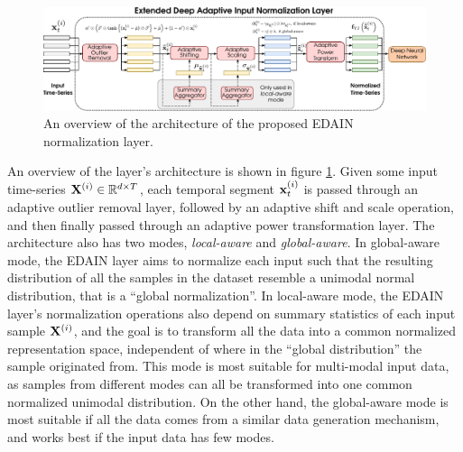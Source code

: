 \documentclass{statsmsc}
\begin{document}
\begin{figure}
\begin{center}
    \includegraphics[width=\textwidth]{diagrams/edain-diagram.pdf}
\end{center}
\caption{An overview of the architecture of the proposed \ac{EDAIN} normalization layer.}
\label{fig:edain-arch}
\end{figure}

An overview of the layer's architecture is shown in figure \cref{fig:edain-arch}.
Given some input time-series $\mathbf{X}^{(i)} \in \mathbb{R}^{d \times T}$, each temporal segment
$\mathbf{x}^{(i)}_t$ is passed through an adaptive outlier removal layer, followed by an adaptive shift
and scale operation, and then finally passed through an adaptive power transformation layer.
The architecture also has two modes, \textit{local-aware} and \textit{global-aware}. In
global-aware mode, the \ac{EDAIN} layer aims to normalize each input such that the resulting
distribution of all the samples in the dataset resemble a unimodal normal distribution, that is
a ``global normalization''. In local-aware mode, 
the \ac{EDAIN} layer's normalization operations
also depend on summary statistics of each input sample $\mathbf{X}^{(i)}$, and the goal is to transform
all the data into a common normalized representation space, independent of where in the
``global distribution'' the sample originated from. This mode is most suitable for
multi-modal input data, as samples from different modes can all be transformed into one common
normalized unimodal distribution. On the other hand, the global-aware mode
is most suitable if all the data comes from a similar data generation mechanism,
and works best if the input data has few modes.
\end{document}

